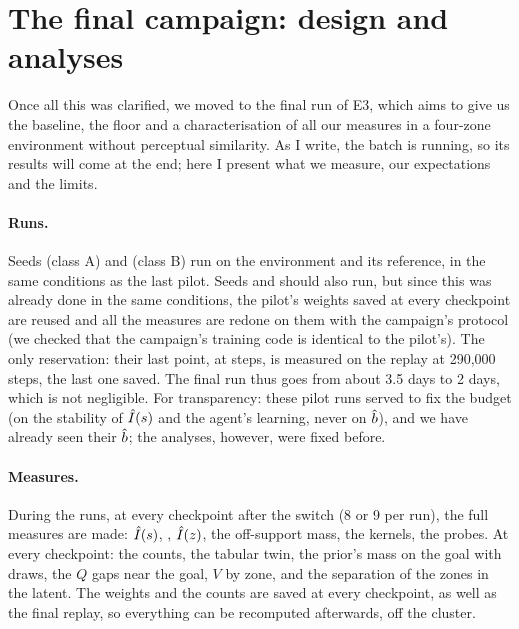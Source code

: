 \documentclass[10pt]{article}
\begin{document}
\section{The final campaign: design and analyses}
\label{sec:campaign}

Once all this was clarified, we moved to the final run of E3, which aims to give us the baseline, the floor and a
characterisation of all our measures in a four-zone environment without perceptual similarity.
As I write, the batch is running, so its results will come at the end; here I present what we measure, our expectations
and the limits.

\paragraph{Runs.}
Seeds \eThreeCampaignSeedA{} (class A) and \eThreeCampaignSeedB{} (class B) run on the environment and its reference,
in the same conditions as the last pilot.
Seeds \eThreePilotSeedA{} and \eThreePilotSeedB{} should also run, but since this was already done in the same
conditions, the pilot's weights saved at every checkpoint are reused and all the measures are redone on them with the
campaign's protocol (we checked that the campaign's training code is identical to the pilot's).
The only reservation: their last point, at \eThreeBudget{} steps, is measured on the replay at 290,000 steps, the last %
one saved. The final run thus goes from about 3.5 days to 2 days, which is not negligible. %
For transparency: these pilot runs served to fix the budget (on the stability of $\hat{I}(s)$ and the agent's learning,
never on $\hat{b}$), and we have already seen their $\hat{b}$; the analyses, however, were fixed before.

\paragraph{Measures.}
During the runs, at every checkpoint after the switch (8 or 9 per run), the full measures are made: $\hat{I}(s)$, %
\Isproj, $\hat{I}(z)$, the off-support mass, the kernels, the probes.
At every checkpoint: the counts, the tabular twin, the prior's mass on the goal with \eThreeGoalDraws{} draws, the $Q$
gaps near the goal, $V$ by zone, and the separation of the zones in the latent.
The weights and the counts are saved at every checkpoint, as well as the final replay, so everything can be recomputed
afterwards, off the cluster.
\end{document}
